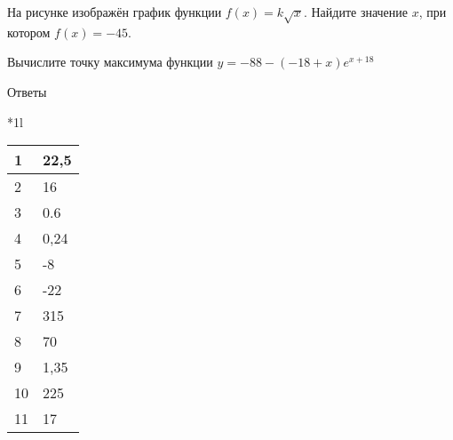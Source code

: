\documentclass[twocolumn]{article}
\begin{document}
\begin{taskBN}{10}
На рисунке изображён график функции $f(x)=k\sqrt{x}$. Найдите значение $x$, при котором $f(x)= -45 $. \vspace{2.5cm}
\end{taskBN}

\begin{taskBN}{11}
Вычислите точку максимума функции $y = -88-(-18+x)e^{x+18}$
\end{taskBN}

\newpage
 Ответы


\begin{tabular}{*{1}l}
\begin{tabular}[t]{|l|l|}
\hline
1 & 22,5\\
\hline
2 & 16\\
\hline
3 & 0.6\\
\hline
4 & 0,24\\
\hline
5 & -8\\
\hline
6 & -22\\
\hline
7 & 315\\
\hline
8 & 70\\
\hline
9 & 1,35\\
\hline
10 & 225\\
\hline
11 & 17\\
\hline
\end{tabular}\end{tabular}



\newpage
\end{document}
